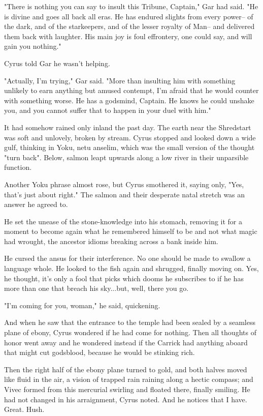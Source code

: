 "There is nothing you can say to insult this Tribune, Captain," Gar had said. "He is divine and goes all back all eras. He has endured slights from every power-- of the dark, and of the starkeepers, and of the lesser royalty of Man-- and delivered them back with laughter. His main joy is foul effrontery, one could say, and will gain you nothing."

Cyrus told Gar he wasn't helping.

"Actually, I'm trying," Gar said. "More than insulting him with something unlikely to earn anything but amused contempt, I'm afraid that he would counter with something worse. He has a godsmind, Captain. He knows he could unshake you, and you cannot suffer that to happen in your duel with him."

\parabreak

It had somehow rained only inland the past day. The earth near the Shredstart was soft and unlovely, broken by stream. Cyrus stopped and looked down a wide gulf, thinking in Yoku, netu anselim, which was the small version of the thought "turn back". Below, salmon leapt upwards along a low river in their unparsible function.

Another Yoku phrase almost rose, but Cyrus smothered it, saying only, "Yes, that's just about right." The salmon and their desperate natal stretch was an answer he agreed to.

He set the unease of the stone-knowledge into his stomach, removing it for a moment to become again what he remembered himself to be and not what magic had wrought, the ancestor idioms breaking across a bank inside him.

He cursed the ansus for their interference. No one should be made to swallow a language whole. He looked to the fish again and shrugged, finally moving on. Yes, he thought, it's only a fool that picks which dooms he subscribes to if he has more than one that breach his sky...but, well, there you go.

"I'm coming for you, woman," he said, quickening.

\parabreak

And when he saw that the entrance to the temple had been sealed by a seamless plane of ebony, Cyrus wondered if he had come for nothing. Then all thoughts of honor went away and he wondered instead if the Carrick had anything aboard that might cut godsblood, because he would be stinking rich.

Then the right half of the ebony plane turned to gold, and both halves moved like fluid in the air, a vision of trapped rain raining along a hectic compass; and Vivec formed from this mercurial swirling and floated there, finally smiling. He had not changed in his arraignment, Cyrus noted. And he notices that I have. Great. Hush.

